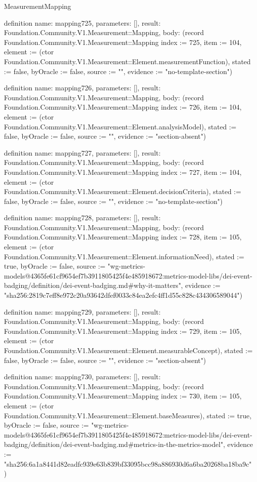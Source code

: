 \begin{lexlean}{MeasurementMapping}
\begin{semanticmodule}
definition{
  name: mapping725,
  parameters: [],
  result: Foundation.Community.V1.Measurement::Mapping,
  body: (record Foundation.Community.V1.Measurement::Mapping {index := 725, item := 104, element := (ctor Foundation.Community.V1.Measurement::Element.measurementFunction), stated := false, byOracle := false, source := "", evidence := "no-template-section"})
}

definition{
  name: mapping726,
  parameters: [],
  result: Foundation.Community.V1.Measurement::Mapping,
  body: (record Foundation.Community.V1.Measurement::Mapping {index := 726, item := 104, element := (ctor Foundation.Community.V1.Measurement::Element.analysisModel), stated := false, byOracle := false, source := "", evidence := "section-absent"})
}

definition{
  name: mapping727,
  parameters: [],
  result: Foundation.Community.V1.Measurement::Mapping,
  body: (record Foundation.Community.V1.Measurement::Mapping {index := 727, item := 104, element := (ctor Foundation.Community.V1.Measurement::Element.decisionCriteria), stated := false, byOracle := false, source := "", evidence := "no-template-section"})
}

definition{
  name: mapping728,
  parameters: [],
  result: Foundation.Community.V1.Measurement::Mapping,
  body: (record Foundation.Community.V1.Measurement::Mapping {index := 728, item := 105, element := (ctor Foundation.Community.V1.Measurement::Element.informationNeed), stated := true, byOracle := false, source := "wg-metrics-models@4365fe61cf9654ef7b3911805425f4e485918672:metrics-model-libs/dei-event-badging/definition/dei-event-badging.md#why-it-matters", evidence := "sha256:2819c7eff8e972c20a93642dfef0033c84ea2efc4ff1d55c828c434306589044"})
}

definition{
  name: mapping729,
  parameters: [],
  result: Foundation.Community.V1.Measurement::Mapping,
  body: (record Foundation.Community.V1.Measurement::Mapping {index := 729, item := 105, element := (ctor Foundation.Community.V1.Measurement::Element.measurableConcept), stated := false, byOracle := false, source := "", evidence := "section-absent"})
}

definition{
  name: mapping730,
  parameters: [],
  result: Foundation.Community.V1.Measurement::Mapping,
  body: (record Foundation.Community.V1.Measurement::Mapping {index := 730, item := 105, element := (ctor Foundation.Community.V1.Measurement::Element.baseMeasures), stated := true, byOracle := false, source := "wg-metrics-models@4365fe61cf9654ef7b3911805425f4e485918672:metrics-model-libs/dei-event-badging/definition/dei-event-badging.md#metrics-in-the-metrics-model", evidence := "sha256:6a1a8441d82eadfc939e63b839bf33095bcc98a886930d6a6ba20268ba18ba9c"})
}


\end{semanticmodule}
\end{lexlean}

